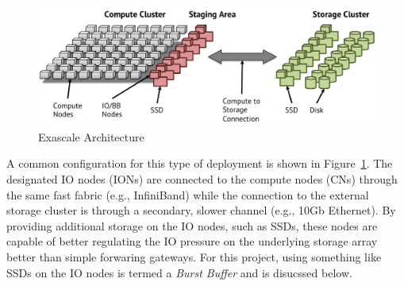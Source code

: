 \documentclass[conference]{IEEEtran}
\begin{document}
\begin{figure}[htbp]
\centering
\vspace{-0.10in}
\includegraphics[width=\columnwidth]{images/exa-arch.png}
\vspace{-0.20in}
\caption{Exascale Architecture}
\label{fig:exa-arch}
\vspace{-0.10in}
\end{figure}

A common configuration for this type of deployment is shown in
Figure~\ref{fig:exa-arch}. The designated IO nodes (IONs) are connected to the
compute nodes (CNs) through the same fast fabric (e.g., InfiniBand) while the
connection to the external storage cluster is through a secondary, slower
channel (e.g., 10Gb Ethernet). By providing additional storage on the IO nodes,
such as SSDs, these nodes are capable of better regulating the IO pressure on
the underlying storage array better than simple forwaring gateways. For this
project, using something like SSDs on the IO nodes is termed a {\em Burst
Buffer} and is disucssed below.

%
%
\end{document}
